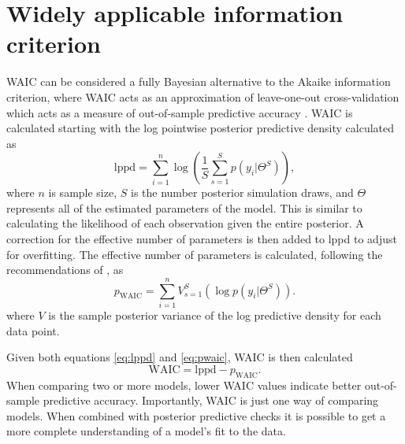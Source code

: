 \documentclass[12pt,letterpaper]{article}
\begin{document}
\section{Widely applicable information criterion} \label{sec:waic}
WAIC can be considered a fully Bayesian alternative to the Akaike information criterion, where WAIC acts as an approximation of leave-one-out cross-validation which acts as a measure of out-of-sample predictive accuracy \citep{Gelman2013d}. WAIC is calculated starting with the log pointwise posterior predictive density calculated as
\begin{equation}
  \mathrm{lppd} = \sum_{i = 1}^{n} \log \left(\frac{1}{S} \sum_{s = 1}^{S} p(y_{i}|\Theta^{S})\right),
  \label{eq:lppd}
\end{equation}
where \(n\) is sample size, \(S\) is the number posterior simulation draws, and \(\Theta\) represents all of the estimated parameters of the model. This is similar to calculating the likelihood of each observation given the entire posterior. A correction for the effective number of parameters is then added to lppd to adjust for overfitting. The effective number of parameters is calculated, following the recommendations of \citet{Gelman2013d}, as
\begin{equation}
  p_{\mathrm{WAIC}} = \sum_{i = 1}^{n} V_{s = 1}^{S} (\log p(y_{i}|\Theta^{S})).
  \label{eq:pwaic}
\end{equation}
where \(V\) is the sample posterior variance of the log predictive density for each data point.

Given both equations \ref{eq:lppd} and \ref{eq:pwaic}, WAIC is then calculated
\begin{equation}
  \mathrm{WAIC} = \mathrm{lppd} - p_{\mathrm{WAIC}}.
  \label{eq:waic}
\end{equation}
When comparing two or more models, lower WAIC values indicate better out-of-sample predictive accuracy. Importantly, WAIC is just one way of comparing models. When combined with posterior predictive checks it is possible to get a more complete understanding of a model's fit to the data.
\end{document}
